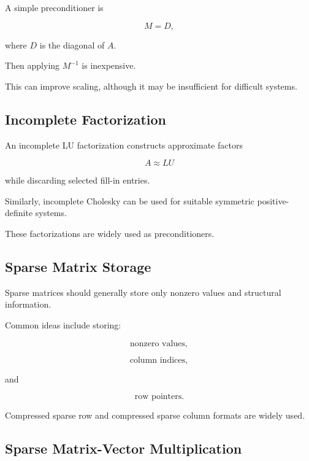 A simple preconditioner is

\[
\boxed{
M
=
D,
}
\]

where \(D\) is the diagonal of \(A\).

Then applying \(M^{-1}\) is inexpensive.

This can improve scaling, although it may be insufficient for difficult
systems.

\subsection{Incomplete Factorization}
\label{subsec:incomplete-factorization}

An incomplete LU factorization constructs approximate factors

\[
\boxed{
A
\approx
LU
}
\]

while discarding selected fill-in entries.

Similarly, incomplete Cholesky can be used for suitable symmetric
positive-definite systems.

These factorizations are widely used as preconditioners.

\subsection{Sparse Matrix Storage}
\label{subsec:sparse-matrix-storage}

Sparse matrices should generally store only nonzero values and structural
information.

Common ideas include storing:

\[
\boxed{
\text{nonzero values},
}
\]

\[
\boxed{
\text{column indices},
}
\]

and

\[
\boxed{
\text{row pointers}.
}
\]

Compressed sparse row and compressed sparse column formats are widely
used.

\subsection{Sparse Matrix-Vector Multiplication}
\label{subsec:sparse-matrix-vector-product}

